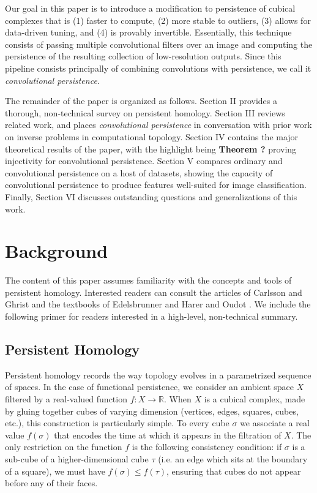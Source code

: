 \documentclass[conference]{IEEEtran}
\theoremstyle{definition}
\numberwithin{figure}{section}
\begin{document}
Our goal in this paper is to introduce a modification to persistence of cubical complexes that is (1) faster to compute, (2) more stable to outliers, (3) allows for data-driven tuning, and (4) is provably invertible. Essentially, this technique consists of passing multiple convolutional filters over an image and computing the persistence of the resulting collection of low-resolution outputs. Since this pipeline consists principally of combining convolutions with persistence, we call it \emph{convolutional persistence}.

The remainder of the paper is organized as follows. Section II provides a thorough, non-technical survey on persistent homology. Section III reviews related work, and places \emph{convolutional persistence} in conversation with prior work on inverse problems in computational topology. Section IV contains the major theoretical results of the paper, with the highlight being {\bf Theorem ?} proving injectivity for convolutional persistence. Section V compares ordinary and convolutional persistence on a host of datasets, showing the capacity of convolutional persistence to produce features well-suited for image classification. Finally, Section VI discusses outstanding questions and generalizations of this work.

\section{Background}
\label{sec:background}
The content of this paper assumes familiarity with the concepts and tools of persistent homology. Interested readers can consult the articles of Carlsson \cite{carlsson2009topology} and Ghrist \cite{ghrist2008barcodes} and the textbooks of 
Edelsbrunner and Harer \cite{edelsbrunner2010computational} and Oudot \cite{oudot2015persistence}. We include the following primer for readers interested in a high-level, non-technical summary.

\subsection{Persistent Homology}

Persistent homology records the way topology evolves in a parametrized sequence of spaces. In the case of functional persistence, we consider an ambient space $X$ filtered by a real-valued function $f:X \to \mathbb{R}$. When $X$ is a cubical complex, made by gluing together cubes of varying dimension (vertices, edges, squares, cubes, etc.), this construction is particularly simple. To every cube $\sigma$ we associate a real value $f(\sigma)$ that encodes the time at which it appears in the filtration of $X$. The only restriction on the function $f$ is the following consistency condition: if $\sigma$ is a sub-cube of a higher-dimensional cube $\tau$ (i.e. an edge which sits at the boundary of a square), we must have $f(\sigma) \leq f(\tau)$, ensuring that cubes do not appear before any of their faces.\\
\end{document}
